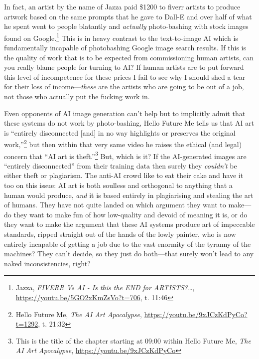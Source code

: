 \documentclass[11pt]{article}
\begin{document}
In fact, an artist by the name of Jazza paid \$1200 to fiverr artists to produce artwork based on the same prompts that he gave to Dall-E and over half of what he spent went to people blatantly and \emph{actually} photo-bashing with stock images found on Google.\footnote{Jazza, \emph{FIVERR Vs AI - Is this the END for ARTISTS?\ldots{}}, \url{https://youtu.be/5GO2xKmZsVo?t=706}, t. 11:46} This is in heavy contrast to the text-to-image AI which is fundamentally incapable of photobashing Google image search results. If this is the quality of work that is to be expected from commissioning human artists, can you really blame people for turning to AI? If human artists are to put forward this level of incompetence for these prices I fail to see why I should shed a tear for their loss of income---\emph{these} are the artists who are going to be out of a job, not those who actually put the fucking work in.

Even opponents of AI image generation can't help but to implicitly admit that these systems do not work by photo-bashing, Hello Future Me tells us that AI art is ``entirely disconnected [and] in no way highlights or preserves the original work,''\footnote{Hello Future Me, \emph{The AI Art Apocalypse}, \url{https://youtu.be/9xJCzKdPyCo?t=1292}, t. 21:32} but then within that very same video he raises the ethical (and legal) concern that ``AI art is theft.''\footnote{This is the title of the chapter starting at 09:00 within Hello Future Me, \emph{The AI Art Apocalypse}, \url{https://youtu.be/9xJCzKdPyCo}} But, which is it? If the AI-generated images are ``entirely disconnected'' from their training data then surely they \emph{couldn't} be either theft or plagiarism. The anti-AI crowd like to eat their cake and have it too on this issue: AI art is both soulless and orthogonal to anything that a human would produce, \emph{and} it is based entirely in plagiarising and stealing the art of humans. They have not quite landed on which argument they want to make---do they want to make fun of how low-quality and devoid of meaning it is, or do they want to make the argument that these AI systems produce art of impeccable standards, ripped straight out of the hands of the lowly painter, who is now entirely incapable of getting a job due to the vast enormity of the tyranny of the machines? They can't decide, so they just do both---that surely won't lead to any naked inconsistencies, right?
\end{document}
